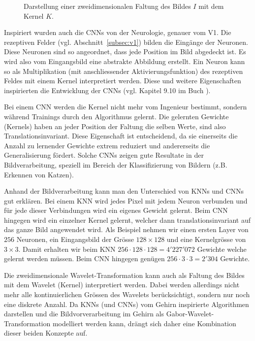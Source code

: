 \begin{figure}
	\centering
	
	\caption{Darstellung einer zweidimensionalen Faltung des Bildes $I$ mit dem Kernel $K$.}
	\label{fig:2dconv}
\end{figure}

Inspiriert wurden auch die CNNs von der Neurologie, genauer vom V1.
Die rezeptiven Felder (vgl. Abschnitt~\ref{subsec:v1}) bilden die Eingänge der Neuronen.
Diese Neuronen sind so angeordnet, dass jede Position im Bild abgedeckt ist.
Es wird also vom Eingangsbild eine abstrakte Abbildung erstellt.
Ein Neuron kann so als Multiplikation (mit anschliessender Aktivierungsfunktion) des rezeptiven Feldes mit einem Kernel interpretiert werden.
Diese und weitere Eigenschaften inspirierten die Entwicklung der CNNs (vgl. Kapitel 9.10 im Buch \cite{book:deeplearning}).

Bei einem CNN werden die Kernel nicht mehr vom Ingenieur bestimmt, sondern während Trainings durch den Algorithmus gelernt.  
Die gelernten Gewichte (Kernels) haben an jeder Position der Faltung die selben Werte, sind also Translationsinvariant.
Diese Eigenschaft ist entscheidend, da sie einerseits die Anzahl zu lernender Gewichte extrem reduziert und andererseits die Generalisierung fördert.
Solche CNNs zeigen gute Resultate in der Bildverarbeitung, speziell im Bereich der Klassifizierung von Bildern (z.B. Erkennen von Katzen).

Anhand der Bildverarbeitung kann man den Unterschied von KNNs und CNNs gut erklären.
Bei einem KNN wird jedes Pixel mit jedem Neuron verbunden und für jede dieser Verbindungen wird ein eigenes Gewicht gelernt.
Beim CNN hingegen wird ein einzelner Kernel gelernt, welcher dann translationsinvariant auf das ganze Bild angewendet wird.
Als Beispiel nehmen wir einen ersten Layer von $256$ Neuronen, ein Eingangsbild der Grösse $128\times128$ und eine Kernelgrösse von $3\times3$.
Damit erhalten wir beim KNN	$256 \cdot 128 \cdot 128 = 4'227'072$ Gewichte welche gelernt werden müssen.
Beim CNN hingegen genügen $256 \cdot 3 \cdot 3 = 2'304$ Gewichte.

Die zweidimensionale Wavelet-Transformation kann auch als Faltung des Bildes mit dem Wavelet (Kernel) interpretiert werden.
Dabei werden allerdings nicht mehr alle kontinuierlichen Grössen des Wavelets berücksichtigt, sondern nur noch eine diskrete Anzahl.
Da KNNs (und CNNs) vom Gehirn inspirierte Algorithmen darstellen und die Bildvorverarbeitung im Gehirn als Gabor-Wavelet-Transformation modelliert werden kann, drängt sich daher eine Kombination dieser beiden Konzepte auf.

